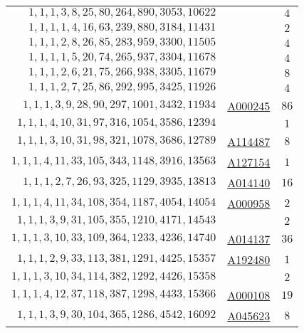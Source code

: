 \begin{longtabu}{|r|l|c|}
    \(    1,    1,    1,    3,    8,   25,   80,  264,  890, 3053,10622\) &	 & \(4\)\\
    \(    1,    1,    1,    1,    4,   16,   63,  239,  880, 3184,11431\) &	 & \(2\)\\
    \(    1,    1,    1,    2,    8,   26,   85,  283,  959, 3300,11505\) &	 & \(4\)\\
    \(    1,    1,    1,    1,    5,   20,   74,  265,  937, 3304,11678\) &	 & \(4\)\\
    \(    1,    1,    1,    2,    6,   21,   75,  266,  938, 3305,11679\) &	& \(8\)\\
    \(    1,    1,    1,    2,    7,   25,   86,  292,  995, 3425,11926\) &	& \(4\)\\
    \(    1,    1,    1,    3,    9,   28,   90,  297, 1001, 3432,11934\) &	\href{http://oeis.org/A000245}{A000245} & \(86\)\\
    \(    1,    1,    1,    4,   10,   31,   97,  316, 1054, 3586,12394\) &	& \(1\)\\
    \(    1,    1,    1,    3,   10,   31,   98,  321, 1078, 3686,12789\) &	\href{http://oeis.org/A114487}{A114487} & \(8\)\\
    \(    1,    1,    1,    4,   11,   33,  105,  343, 1148, 3916,13563\) &	\href{http://oeis.org/A127154}{A127154} & \(1\)\\
    \(    1,    1,    1,    2,    7,   26,   93,  325, 1129, 3935,13813\) &	\href{http://oeis.org/A014140}{A014140} & \(16\)\\
    \(    1,    1,    1,    4,   11,   34,  108,  354, 1187, 4054,14054\) &	\href{http://oeis.org/A000958}{A000958} & \(2\)\\
    \(    1,    1,    1,    3,    9,   31,  105,  355, 1210, 4171,14543\) &	& \(2\)\\
    \(    1,    1,    1,    3,   10,   33,  109,  364, 1233, 4236,14740\) &	\href{http://oeis.org/A014137}{A014137}& \(36\)\\
    \(    1,    1,    1,    2,    9,   33,  113,  381, 1291, 4425,15357\) &	\href{http://oeis.org/A192480}{A192480}& \(1\)\\
    \(    1,    1,    1,    3,   10,   34,  114,  382, 1292, 4426,15358\) &	& \(2\)\\
    \(    1,    1,    1,    4,   12,   37,  118,  387, 1298, 4433,15366\) &	\href{http://oeis.org/A000108}{A000108} & \(19\)\\
    \(    1,    1,    1,    3,    9,   30,  104,  365, 1286, 4542,16092\) &	\href{http://oeis.org/A045623}{A045623} & \(8\)\\

\end{longtabu}
